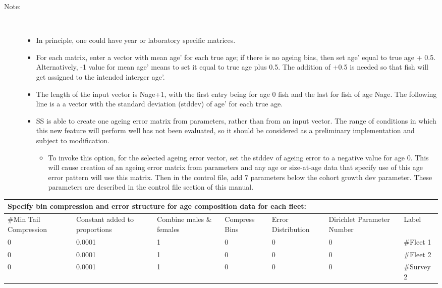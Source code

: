 \begin{description}
	\item[Note:]\
	\begin{itemize}		
		\item In principle, one could have year or laboratory specific matrices.
		\item For each matrix, enter a vector with mean age’ for each true age; if there is no ageing bias, then set age’ equal to true age + 0.5.  Alternatively, -1 value for mean age’ means to set it equal to true age plus 0.5.  The addition of +0.5 is needed so that fish will get assigned to the intended interger age’.
		\item The length of the input vector is Nage+1, with the first entry being for age 0 fish and the last for fish of age Nage. The following line is a a vector with the standard deviation (stddev) of age’ for each true age.
		\item SS is able to create one ageing error matrix from parameters, rather than from an input vector.  The range of conditions in which this new feature will perform well has not been evaluated, so it should be considered as a preliminary implementation and subject to modification.
			\begin{itemize}
				\item To invoke this option, for the selected ageing error vector, set the stddev of ageing error to a negative value for age 0.  This will cause creation of an ageing error matrix from parameters and any age or size-at-age data that specify use of this age error pattern will use this matrix. Then in the control file, add 7 parameters below the cohort growth dev parameter.  These parameters are described in the control file section of this manual.
			\end{itemize}			  
	\end{itemize}
\end{description}


\begin{tabular}{p{1.75cm} p{2cm} p{1.75cm} p{2cm} p{2cm} p{2cm} p{1.75cm}}
		\multicolumn{7}{l}{Specify bin compression and error structure for age composition data for each fleet:}\\
		\hline
		\#Min Tail Compression & Constant added to proportions & Combine males \& females & Compress Bins & Error Distribution & Dirichlet Parameter Number & Label\\
		\hline
		0 & 0.0001 & 1 & 0 & 0 & 0 & \#Fleet 1\\
		0 & 0.0001 & 1 & 0 & 0 & 0 & \#Fleet 2\\
		0 & 0.0001 & 1 & 0 & 0 & 0 & \#Survey 2\\
		\hline
\end{tabular}

